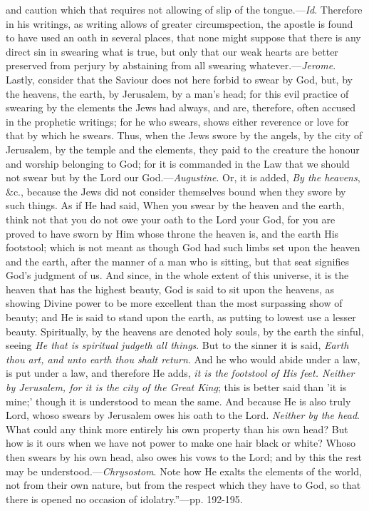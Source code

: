 and caution which that requires not allowing of slip of the tongue.—\emph{Id}.
Therefore in his writings, as writing allows of greater circumspection,
the apostle is found to have used an oath in several places, that none
might suppose that there is any direct sin in swearing what is true, but
only that our weak hearts are better preserved from perjury by
abstaining from all swearing whatever.—\emph{Jerome}. Lastly, consider
that the Saviour does not here forbid to swear by God, but, by the
heavens, the earth, by Jerusalem, by a man's head; for this evil
practice of swearing by the elements the Jews had always, and are,
therefore, often accused in the prophetic writings; for he who swears,
shows either reverence or love for that by which he swears. Thus, when
the Jews swore by the angels, by the city of Jerusalem, by the temple
and the elements, they paid to the creature the honour and worship
belonging to God; for it is commanded in the Law that we should not
swear but by the Lord our God.—\emph{Augustine}. Or, it is added, \emph{By
the heavens}, \&c., because the Jews did not consider themselves
bound when they swore by such things. As if He had said, When you swear
by the heaven and the earth, think not that you do not owe your oath to
the Lord your God, for you are proved to have sworn by Him whose throne
the heaven is, and the earth His footstool; which is not meant as though
God had such limbs set upon the heaven and the earth, after the manner
of a man who is sitting, but that seat signifies God's judgment of us.
And since, in the whole extent of this universe, it is the heaven that
has the highest beauty, God is said to sit upon the heavens, as showing
Divine power to be more excellent than the most surpassing show of
beauty; and He is said to stand upon the earth, as putting to lowest use
a lesser beauty. Spiritually, by the heavens are denoted holy souls, by
the earth the sinful, seeing \emph{He that is spiritual judgeth all things}.
But to the sinner it is said, \emph{Earth thou art, and unto earth thou
shalt return}. And he who would abide under a law, is put under a
law, and therefore He adds, \emph{it is the footstool of His feet. Neither
by Jerusalem, for it is the city of the Great King}; this is better
said than 'it is mine;' though it is understood to mean the same. And
because He is also truly Lord, whoso swears by Jerusalem owes his oath
to the Lord. \emph{Neither by the head}. What could any think more
entirely his own property than his own head? But how is it ours when we
have not power to make one hair black or white? Whoso then swears by his
own head, also owes his vows to the Lord; and by this the rest may be
understood.—\emph{Chrysostom}. Note how He exalts the elements of the
world, not from their own nature, but from the respect which they have
to God, so that there is opened no occasion of idolatry.''—pp. 192-195.

